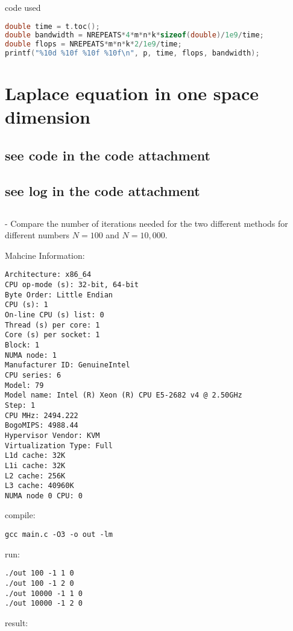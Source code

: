 \documentclass[titlepage]{article}
\begin{document}
\bigskip

code used

\begin{lstlisting}[language=c]
double time = t.toc();
double bandwidth = NREPEATS*4*m*n*k*sizeof(double)/1e9/time;
double flops = NREPEATS*m*n*k*2/1e9/time;
printf("%10d %10f %10f %10f\n", p, time, flops, bandwidth);
\end{lstlisting}

\newpage
\section{Laplace equation in one space dimension}

\subsection{see code in the code attachment}

\subsection{see log in the code attachment}

\subsection{}

- Compare the number of iterations needed for the two 
different methods for different numbers $N = 100$ and $N = 10, 000$.

Mahcine Information:
\begin{verbatim}
Architecture: x86_64
CPU op-mode (s): 32-bit, 64-bit
Byte Order: Little Endian
CPU (s): 1
On-line CPU (s) list: 0
Thread (s) per core: 1
Core (s) per socket: 1
Block: 1
NUMA node: 1
Manufacturer ID: GenuineIntel
CPU series: 6
Model: 79
Model name: Intel (R) Xeon (R) CPU E5-2682 v4 @ 2.50GHz
Step: 1
CPU MHz: 2494.222
BogoMIPS: 4988.44
Hypervisor Vendor: KVM
Virtualization Type: Full
L1d cache: 32K
L1i cache: 32K
L2 cache: 256K
L3 cache: 40960K
NUMA node 0 CPU: 0
\end{verbatim}

compile:
\begin{verbatim}
gcc main.c -O3 -o out -lm 
\end{verbatim}

run:
\begin{verbatim}
./out 100 -1 1 0
./out 100 -1 2 0
./out 10000 -1 1 0
./out 10000 -1 2 0
\end{verbatim}
result:
\end{document}
